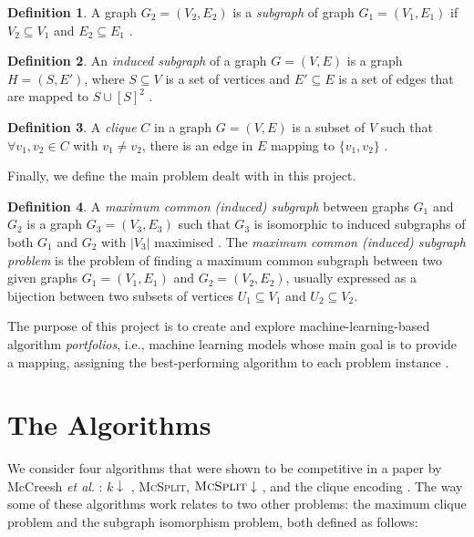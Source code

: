 \documentclass{l4proj}
\theoremstyle{definition}
\newtheorem{definition}{Definition}[chapter]
\theoremstyle{remark}
\begin{document}
\begin{definition} A graph $G_2 = (V_2, E_2)$ is a \emph{subgraph} of graph $G_1
  = (V_1, E_1)$ if $V_2 \subseteq V_1$ and $E_2 \subseteq E_1$
  \cite{DBLP:books/daglib/0030488}.
\end{definition}

\begin{definition} \label{def:induced_subgraph}
  An \emph{induced subgraph} of a graph $G = (V, E)$ is a graph $H = (S, E')$,
  where $S \subseteq V$ is a set of vertices and $E' \subseteq E$ is a set of
  edges that are mapped to $S \cup [S]^2$
  \cite{DBLP:journals/jcamd/RaymondW02a}.
\end{definition}

\begin{definition}
  A \emph{clique} $C$ in a graph $G = (V, E)$ is a subset of $V$ such that
  $\forall v_1, v_2 \in C$ with $v_1 \ne v_2$, there is an edge in $E$ mapping
  to $\{ v_1, v_2 \}$ \cite{DBLP:journals/jgo/PardalosX94a}.
\end{definition}

Finally, we define the main problem dealt with in this project.

\begin{definition}
  A \emph{maximum common (induced) subgraph} between graphs $G_1$ and $G_2$ is a
  graph $G_3 = (V_3, E_3)$ such that $G_3$ is isomorphic to induced subgraphs of
  both $G_1$ and $G_2$ with $|V_3|$ maximised
  \cite{DBLP:journals/jcamd/RaymondW02a}. The \emph{maximum common (induced)
    subgraph problem} is the problem of finding a maximum common subgraph
  between two given graphs $G_1 = (V_1, E_1)$ and $G_2 = (V_2, E_2)$, usually
  expressed as a bijection between two subsets of vertices $U_1 \subseteq V_1$
  and $U_2 \subseteq V_2$.
\end{definition}

The purpose of this project is to create and explore machine-learning-based
algorithm \emph{portfolios}, i.e., machine learning models whose main goal is to
provide a mapping, assigning the best-performing algorithm to each problem
instance \cite{DBLP:journals/ai/BischlKKLMFHHLT16, DBLP:journals/ac/Rice76}.

\section{The Algorithms}

We consider four algorithms that were shown to be competitive in a paper by
McCreesh \textit{et al}. \cite{DBLP:conf/ijcai/McCreeshPT17}: $k\downarrow$
\cite{DBLP:conf/aaai/HoffmannMR17}, \textsc{McSplit},
$\textsc{McSplit}\downarrow$ \cite{DBLP:conf/ijcai/McCreeshPT17}, and the clique
encoding \cite{DBLP:conf/cp/McCreeshNPS16}. The way some of these algorithms
work relates to two other problems: the maximum clique problem and the subgraph
isomorphism problem, both defined as follows:
\end{document}
